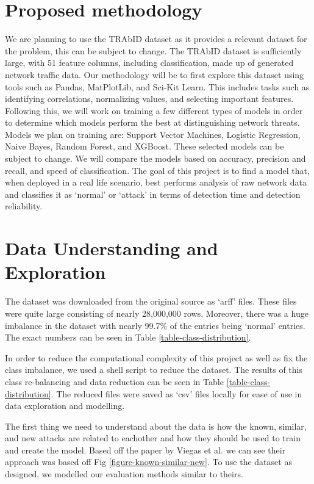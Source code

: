 \documentclass[journal]{IEEEtran}
\begin{document}
\section{Proposed methodology}
We are planning to use the TRAbID dataset \cite{viegas2017toward} as it provides a relevant dataset for the problem, this can be subject to change. The TRAbID dataset is sufficiently large, with 51 feature columns, including classification, made up of generated network traffic data. Our methodology will be to first explore this dataset using tools such as Pandas, MatPlotLib, and Sci-Kit Learn. This includes tasks such as identifying correlations, normalizing values, and selecting important features. Following this, we will work on training a few different types of models in order to determine which models perform the best at distinguishing network threats. Models we plan on training are: Support Vector Machines, Logistic Regression, Naive Bayes, Random Forest, and XGBoost. These selected models can be subject to change. We will compare the models based on accuracy, precision and recall, and speed of classification. The goal of this project is to find a model that, when deployed in a real life scenario, best performs analysis of raw network data and classifies it as `normal' or `attack' in terms of detection time and detection reliability.

\section{Data Understanding and Exploration}
\label{data-understanding-and-exploation}
The dataset was downloaded from the original source as `arff' files. These files were quite large consisting of nearly 28,000,000 rows. Moreover, there was a huge imbalance in the dataset with nearly 99.7\% of the entries being `normal' entries. The exact numbers can be seen in Table \ref{table-class-distribution}.



In order to reduce the computational complexity of this project as well as fix the class imbalance, we used a shell script to reduce the dataset. The results of this class re-balancing and data reduction can be seen in Table \ref{table-class-distribution}. The reduced files were saved as `csv' files locally for ease of use in data exploration and modelling. 


The first thing we need to understand about the data is how the known, similar, and new attacks are related to eachother and how they should be used to train and create the model. Based off the paper by Viegas et al. we can see their approach was based off Fig \ref{figure-known-similar-new}.\cite{viegas2017toward} To use the dataset as designed, we modelled our evaluation methods similar to theirs.
\end{document}
